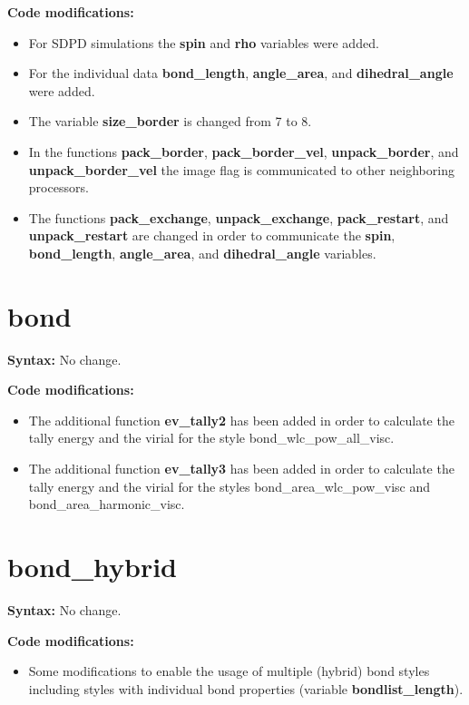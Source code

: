 {\bfseries Code modifications:}
\begin{itemize}
\item For SDPD simulations the \textbf{spin} and \textbf{rho} variables were added.
\item For the individual data \textbf{bond\_length}, \textbf{angle\_area}, and \textbf{dihedral\_angle} were added.
\item The variable \textbf{size\_border} is changed from 7 to 8.
\item In the functions \textbf{pack\_border}, \textbf{pack\_border\_vel}, \textbf{unpack\_border}, and \textbf{unpack\_border\_vel} the image
  flag is communicated to other neighboring processors.
\item The functions \textbf{pack\_exchange}, \textbf{unpack\_exchange}, \textbf{pack\_restart}, and \textbf{unpack\_restart} are changed in order
  to communicate the \textbf{spin}, \textbf{bond\_length}, \textbf{angle\_area}, and \textbf{dihedral\_angle} variables.
\end{itemize}

\section{bond}

{\bfseries Syntax:} No change.
\vspace{0.2cm}

{\bfseries Code modifications:}
\begin{itemize}
\item The additional function \textbf{ev\_tally2} has been added in order to calculate the tally energy and the virial for the style bond\_wlc\_pow\_all\_visc.
\item The additional function \textbf{ev\_tally3} has been added in order to calculate the tally energy and the virial for the styles bond\_area\_wlc\_pow\_visc and bond\_area\_harmonic\_visc.  
\end{itemize}

\section{bond\_hybrid}

{\bfseries Syntax:} No change.
\vspace{0.2cm}

{\bfseries Code modifications:}
\begin{itemize}
\item Some modifications to enable the usage of multiple (hybrid) bond styles including styles with individual bond properties (variable \textbf{bondlist\_length}). 
\end{itemize}

